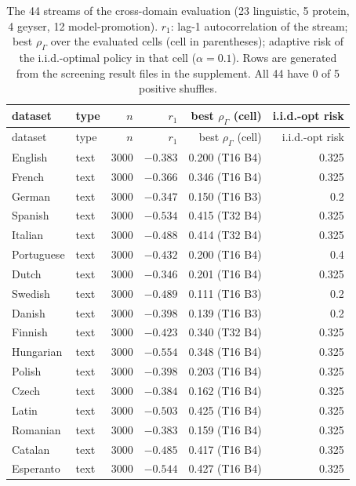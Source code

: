 \documentclass{article}
\theoremstyle{plain}
\theoremstyle{definition}
\theoremstyle{remark}
\newcommand{\rhoG}{\rho_\Gamma}
\begin{document}
\begin{longtable}{llrrrr}
\caption{The 44 streams of the cross-domain evaluation (23 linguistic, 5 protein, 4 geyser, 12 model-promotion). $r_1$: lag-1 autocorrelation of the stream; best $\rhoG$ over the evaluated cells (cell in parentheses); adaptive risk of the i.i.d.-optimal policy in that cell ($\alpha=0.1$). Rows are generated from the screening result files in the supplement. All 44 have 0 of 5 positive shuffles.}
\label{tab:real35}\\
\toprule
dataset & type & $n$ & $r_1$ & best $\rhoG$ (cell) & i.i.d.-opt risk\\
\midrule
\endfirsthead
\toprule
dataset & type & $n$ & $r_1$ & best $\rhoG$ (cell) & i.i.d.-opt risk\\
\midrule
\endhead
English & text & 3000 & $-0.383$ & 0.200 (T16 B4) & 0.325\\
French & text & 3000 & $-0.366$ & 0.346 (T16 B4) & 0.325\\
German & text & 3000 & $-0.347$ & 0.150 (T16 B3) & 0.2\\
Spanish & text & 3000 & $-0.534$ & 0.415 (T32 B4) & 0.325\\
Italian & text & 3000 & $-0.488$ & 0.414 (T32 B4) & 0.325\\
Portuguese & text & 3000 & $-0.432$ & 0.200 (T16 B4) & 0.4\\
Dutch & text & 3000 & $-0.346$ & 0.201 (T16 B4) & 0.325\\
Swedish & text & 3000 & $-0.489$ & 0.111 (T16 B3) & 0.2\\
Danish & text & 3000 & $-0.398$ & 0.139 (T16 B3) & 0.2\\
Finnish & text & 3000 & $-0.423$ & 0.340 (T32 B4) & 0.325\\
Hungarian & text & 3000 & $-0.554$ & 0.348 (T16 B4) & 0.325\\
Polish & text & 3000 & $-0.398$ & 0.203 (T16 B4) & 0.325\\
Czech & text & 3000 & $-0.384$ & 0.162 (T16 B4) & 0.325\\
Latin & text & 3000 & $-0.503$ & 0.425 (T16 B4) & 0.325\\
Romanian & text & 3000 & $-0.383$ & 0.159 (T16 B4) & 0.325\\
Catalan & text & 3000 & $-0.485$ & 0.417 (T16 B4) & 0.325\\
Esperanto & text & 3000 & $-0.544$ & 0.427 (T16 B4) & 0.325\\

\end{longtable}
\end{document}
